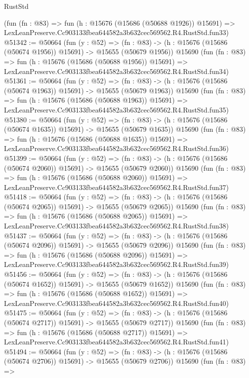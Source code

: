 \begin{lexlean}{RustStd}
\begin{coremodule}
    (fun (fn : @83) =>
    fun (h : @15676 (@15686 (@50688 @1926)) @15691) =>
    LexLeanPreserve.Cc903133fbea644582a3b632cec569562.R4.RustStd.fun33)
@51342 := @50664
    (fun (y : @52) =>
    (fn : @83) -> (h : @15676 (@15686 (@50674 @1956)) @15691) -> @15655 (@50679 @1956))
    @15690
    (fun (fn : @83) =>
    fun (h : @15676 (@15686 (@50688 @1956)) @15691) =>
    LexLeanPreserve.Cc903133fbea644582a3b632cec569562.R4.RustStd.fun34)
@51361 := @50664
    (fun (y : @52) =>
    (fn : @83) -> (h : @15676 (@15686 (@50674 @1963)) @15691) -> @15655 (@50679 @1963))
    @15690
    (fun (fn : @83) =>
    fun (h : @15676 (@15686 (@50688 @1963)) @15691) =>
    LexLeanPreserve.Cc903133fbea644582a3b632cec569562.R4.RustStd.fun35)
@51380 := @50664
    (fun (y : @52) =>
    (fn : @83) -> (h : @15676 (@15686 (@50674 @1635)) @15691) -> @15655 (@50679 @1635))
    @15690
    (fun (fn : @83) =>
    fun (h : @15676 (@15686 (@50688 @1635)) @15691) =>
    LexLeanPreserve.Cc903133fbea644582a3b632cec569562.R4.RustStd.fun36)
@51399 := @50664
    (fun (y : @52) =>
    (fn : @83) -> (h : @15676 (@15686 (@50674 @2060)) @15691) -> @15655 (@50679 @2060))
    @15690
    (fun (fn : @83) =>
    fun (h : @15676 (@15686 (@50688 @2060)) @15691) =>
    LexLeanPreserve.Cc903133fbea644582a3b632cec569562.R4.RustStd.fun37)
@51418 := @50664
    (fun (y : @52) =>
    (fn : @83) -> (h : @15676 (@15686 (@50674 @2065)) @15691) -> @15655 (@50679 @2065))
    @15690
    (fun (fn : @83) =>
    fun (h : @15676 (@15686 (@50688 @2065)) @15691) =>
    LexLeanPreserve.Cc903133fbea644582a3b632cec569562.R4.RustStd.fun38)
@51437 := @50664
    (fun (y : @52) =>
    (fn : @83) -> (h : @15676 (@15686 (@50674 @2096)) @15691) -> @15655 (@50679 @2096))
    @15690
    (fun (fn : @83) =>
    fun (h : @15676 (@15686 (@50688 @2096)) @15691) =>
    LexLeanPreserve.Cc903133fbea644582a3b632cec569562.R4.RustStd.fun39)
@51456 := @50664
    (fun (y : @52) =>
    (fn : @83) -> (h : @15676 (@15686 (@50674 @1652)) @15691) -> @15655 (@50679 @1652))
    @15690
    (fun (fn : @83) =>
    fun (h : @15676 (@15686 (@50688 @1652)) @15691) =>
    LexLeanPreserve.Cc903133fbea644582a3b632cec569562.R4.RustStd.fun40)
@51475 := @50664
    (fun (y : @52) =>
    (fn : @83) -> (h : @15676 (@15686 (@50674 @2717)) @15691) -> @15655 (@50679 @2717))
    @15690
    (fun (fn : @83) =>
    fun (h : @15676 (@15686 (@50688 @2717)) @15691) =>
    LexLeanPreserve.Cc903133fbea644582a3b632cec569562.R4.RustStd.fun41)
@51494 := @50664
    (fun (y : @52) =>
    (fn : @83) -> (h : @15676 (@15686 (@50674 @2706)) @15691) -> @15655 (@50679 @2706))
    @15690
    (fun (fn : @83) =>

\end{coremodule}
\end{lexlean}
